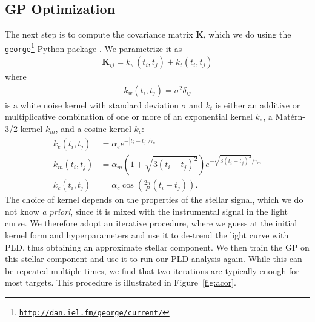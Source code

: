 \documentclass[]{emulateapj}
\begin{document}
\pagebreak

\subsection{GP Optimization}
\label{sec:gpopt}
\begin{figure*}[t]
  \begin{center}
    \leavevmode
       \caption{GP optimization procedure for EPIC 201497682. In the top left panel we 
                plot the raw SAP flux (black) and a ten chunk, first order PLD fit
                (red); the residuals are shown in the panel below. These are used to
                compute the power spectrum of the stellar signal (top right), and
                its autocorrelation function (bottom right, black curve). Different
                kernels are then fit to the autocorrelation function, and the one
                with the lowest $\chi^2$ value is chosen for the de-trending step
                (red curve). The grey envelope about the autocorrelation curve is
                the ad hoc standard error assumed to compute $\chi^2$.
                }
     \label{fig:acor}
  \end{center}
\end{figure*}

The next step is to compute the covariance matrix $\mathbf{K}$, which we do using
the \texttt{george}\footnote{\texttt{\url{http://dan.iel.fm/george/current/}}} Python package
\citep{GEORGE}. We parametrize 
it as
\begin{align}
\label{eq:covariance}
\mathbf{K}_{ij} = k_w(t_i, t_j) + k_t(t_i, t_j)
\end{align}
where
\begin{align}
\label{eq:whitekernel}
k_w(t_i, t_j) = \sigma^2\delta_{ij}
\end{align}
is a white noise kernel with standard deviation $\sigma$ and $k_t$ is either an 
additive or multiplicative combination
of one or more of an exponential kernel $k_e$, a Mat\'ern-3/2 kernel $k_m$, and
a cosine kernel $k_c$:
\begin{align}
\label{eq:kernels}
k_e(t_i, t_j) &= \alpha_e e^{-\left|t_i - t_j\right|/\tau_e}\nonumber\\
k_m(t_i, t_j) &= \alpha_m \left(1 + \sqrt{3(t_i - t_j)^2}\right) e^{-\sqrt{3(t_i - t_j)^2}/\tau_m}\nonumber\\ 
k_c(t_i, t_j) &= \alpha_c \cos{\left(\frac{2\pi}{P}(t_i - t_j)\right)}.
\end{align}
The choice of kernel depends on the properties of the stellar signal, which we do
not know \emph{a priori}, since it is mixed with the instrumental signal in the
light curve. We therefore adopt an iterative procedure, where we guess at the initial
kernel form and hyperparameters and use it to de-trend the light curve with PLD, thus
obtaining an approximate stellar component. We then train the GP on this stellar
component and use it to run our PLD analysis again. While this can be repeated
multiple times, we find that two iterations are typically enough for most targets. This procedure
is illustrated in Figure~\ref{fig:acor}.
\end{document}
